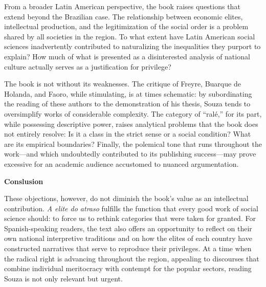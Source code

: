 From a broader Latin American perspective, the book raises questions that extend beyond the Brazilian case. The relationship between economic elites, intellectual production, and the legitimization of the social order is a problem shared by all societies in the region. To what extent have Latin American social sciences inadvertently contributed to naturalizing the inequalities they purport to explain? How much of what is presented as a disinterested analysis of national culture actually serves as a justification for privilege?

The book is not without its weaknesses. The critique of Freyre, Buarque de Holanda, and Faoro, while stimulating, is at times schematic: by subordinating the reading of these authors to the demonstration of his thesis, Souza tends to oversimplify works of considerable complexity. The category of “ralé,” for its part, while possessing descriptive power, raises analytical problems that the book does not entirely resolve: Is it a class in the strict sense or a social condition? What are its empirical boundaries? Finally, the polemical tone that runs throughout the work—and which undoubtedly contributed to its publishing success—may prove excessive for an academic audience accustomed to nuanced argumentation.

\textbf{Conslusion}

These objections, however, do not diminish the book’s value as an intellectual contribution. \textit{A elite do atraso} fulfills the function that every good work of social science should: to force us to rethink categories that were taken for granted. For Spanish-speaking readers, the text also offers an opportunity to reflect on their own national interpretive traditions and on how the elites of each country have constructed narratives that serve to reproduce their privileges. At a time when the radical right is advancing throughout the region, appealing to discourses that combine individual meritocracy with contempt for the popular sectors, reading Souza is not only relevant but urgent.


